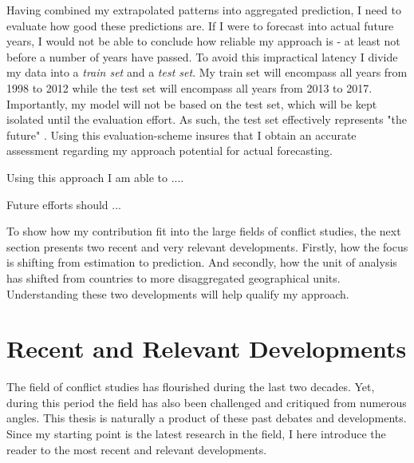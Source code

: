 \documentclass[a4paper]{article}
\begin{document}
Having combined my extrapolated patterns into aggregated prediction, I need to evaluate how good these predictions are. If I were to forecast into actual future years, I would not be able to conclude how reliable my approach is - at least not before a number of years have passed. To avoid this impractical latency I divide my data into a \emph{train set} and a \emph{test set}. My train set will encompass all years from 1998 to 2012 while the test set will encompass all years from 2013 to 2017. Importantly, my model will not be based on the test set, which will be kept isolated until the evaluation effort. As such, the test set effectively represents "the future" \cite[199-200]{Goldstone_2010}. Using this evaluation-scheme insures that I obtain an accurate assessment regarding my approach potential for actual forecasting.\par 

Using this approach I am able to ....\par %

Future efforts should ...\par

To show how my contribution fit into the large fields of conflict studies, the next section presents two recent and very relevant developments. Firstly, how the focus is shifting from estimation to prediction. And secondly, how the unit of analysis has shifted from countries to more disaggregated geographical units. Understanding these two developments will help qualify my approach.\par

\section{Recent and Relevant Developments}\label{challenges}


The field of conflict studies has flourished during the last two decades. Yet, during this period the field has also been challenged and critiqued from numerous angles. This thesis is naturally a product of these past debates and developments. Since my starting point is the latest research in the field, I here introduce the reader to the most recent and relevant developments.\par
\end{document}
